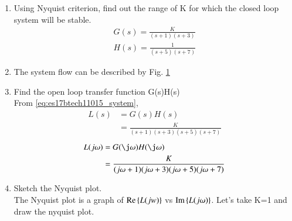 \begin{enumerate}[label=\thesection.\arabic*.,ref=\thesection.\theenumi]

\item Using Nyquist criterion, find out the range of K for which the closed loop system will be stable.\newline
\begin{align}
\label{eq:es17btech11015_system}
    \nonumber G(s)=\frac{K}{(s+1)(s+3)}
    \\
    H(s)=\frac{1}{(s+5)(s+7)}
\end{align}

\item The system flow can be described by Fig. \ref{fig:es17btech11015_fig1}
\begin{figure}[!ht]
    \begin{center}
        \resizebox{\columnwidth}{!}{}
    \end{center}
    \caption{}  
    \label{fig:es17btech11015_fig1}
\end{figure}
\item Find the open loop transfer function G(s)H(s)
\\
\solution From \eqref{eq:es17btech11015_system},
%
 \begin{align}
 \label{eq:es17btech11015_openloop}
L(s)&=G(s)H(s)\nonumber\\
&=\frac{K}{(s+1)(s+3)(s+5)(s+7)}
 \end{align}
 \begin{align}
L(j\omega)&=G(\j \omega)H(\j \omega)\nonumber\\
&=\frac{K}{(j\omega+1)(j\omega+3)(j\omega+5)(j\omega+7)}
\end{align}

\item Sketch the Nyquist plot.
\\
\solution The Nyquist plot is a graph of $\text{Re} \left\{L(jw)\right\}$  vs $\text{Im} \left\{L(j\omega)\right\}$.
Let's take K=1 and draw the nyquist plot.
\\


\end{enumerate}

